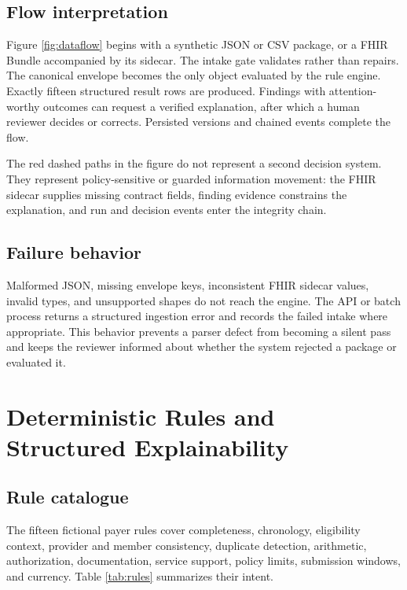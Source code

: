 \documentclass[11pt,a4paper,oneside]{report}
\begin{document}
\section{Flow interpretation}
Figure \ref{fig:dataflow} begins with a synthetic JSON or CSV package, or a FHIR Bundle accompanied by its sidecar. The intake gate validates rather than repairs. The canonical envelope becomes the only object evaluated by the rule engine. Exactly fifteen structured result rows are produced. Findings with attention-worthy outcomes can request a verified explanation, after which a human reviewer decides or corrects. Persisted versions and chained events complete the flow.

The red dashed paths in the figure do not represent a second decision system. They represent policy-sensitive or guarded information movement: the FHIR sidecar supplies missing contract fields, finding evidence constrains the explanation, and run and decision events enter the integrity chain.

\section{Failure behavior}
Malformed JSON, missing envelope keys, inconsistent FHIR sidecar values, invalid types, and unsupported shapes do not reach the engine. The API or batch process returns a structured ingestion error and records the failed intake where appropriate. This behavior prevents a parser defect from becoming a silent pass and keeps the reviewer informed about whether the system rejected a package or evaluated it.

\chapter{Deterministic Rules and Structured Explainability}

\section{Rule catalogue}
The fifteen fictional payer rules cover completeness, chronology, eligibility context, provider and member consistency, duplicate detection, arithmetic, authorization, documentation, service support, policy limits, submission windows, and currency. Table \ref{tab:rules} summarizes their intent.
\end{document}
